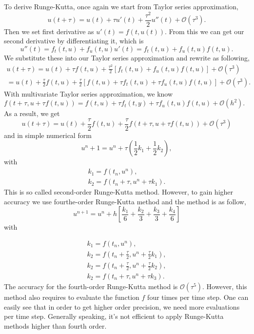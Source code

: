 \documentclass[10pt,a4paper]{report}
\begin{document}
To derive Runge-Kutta, once again we start from Taylor series approximation, 
\begin{equation}
u(t+\tau)=u(t)+\tau u'(t)+{\frac{\tau^2}{2}}u''(t)+\mathcal{O}(\tau^3).
\end{equation}
Then we set first derivative as $u'(t)=f(t,u(t))$. From this we can get our second derivative by differentiating it, which is
\begin{equation}
u''(t)=f_t(t,u)+f_u(t,u)u'(t)=f_t(t,u)+f_u(t,u)f(t,u).
\end{equation}
 We substitute these into our Taylor series approximation and rewrite as following,
\begin{align} %
u(t+\tau)
=u(t)+\tau f(t,u)+{\frac{\tau^2}{2}}[f_t(t,u)+f_u(t,u)f(t,u)]+\mathcal{O}(\tau^3)\\
=u(t)+{\frac{\tau}{2}} f(t,u)+{\frac{\tau}{2}}[f(t,u)+\tau f_t(t,u)+\tau f_u(t,u)f(t,u)]+\mathcal{O}(\tau^3).  
\end{align}
With multivariate Taylor series approximation, we know $f(t+\tau,u+\tau f(t,u))=f(t,u)+\tau f_t(t,y)+\tau f_u(t,u)f(t,u)+\mathcal{O}(h^2).$ As a result, we get
\begin{equation}
u(t+\tau)=u(t)+{\frac{\tau}{2}}f(t,u)+{\frac{\tau}{2}}f(t+\tau,u+\tau f(t,u))+\mathcal{O}(\tau^3)
\end{equation}
 and in simple numerical form
\begin{equation}
 u^n+1=u^n+\tau ({\frac{1}{2}}k_1+{\frac{1}{2}}k_2),
 \end{equation} 
with 
\begin{align}
k_1=f(t_n,u^n),\\
k_2 = f(t_n+\tau, u^n+\tau k_1).
\end{align}
This is so called second-order Runge-Kutta method. However, to gain higher accuracy we use fourthe-order Runge-Kutta method and the method is as follow,
\begin{equation}
u^{n+1}=u^n+h[{\frac{k_1}{6}}+{\frac{k_2}{3}}+{\frac{k_3}{3}}+{\frac{k_4}{6}}]
\end{equation}
with

\begin{align*}
k_1=f(t_n,u^n),\\
k_2=f(t_n+{\frac{\tau}{2}},u^n+{\frac{\tau}{2}}k_1),\\
k_2=f(t_n+{\frac{\tau}{2}},u^n+{\frac{\tau}{2}}k_2),\\
k_2=f(t_n+\tau,u^n+\tau k_3).
\end{align*}
The accuracy for the fourth-order Runge-Kutta method is $\mathcal{O}(\tau^5)$. However, this method also requires to evaluate the function $f$ four times per time step. One can easily see that in order to get higher order precision, we need more evaluations per time step. Generally speaking, it's not efficient to apply Runge-Kutta methods higher than fourth order. 
\end{document}

